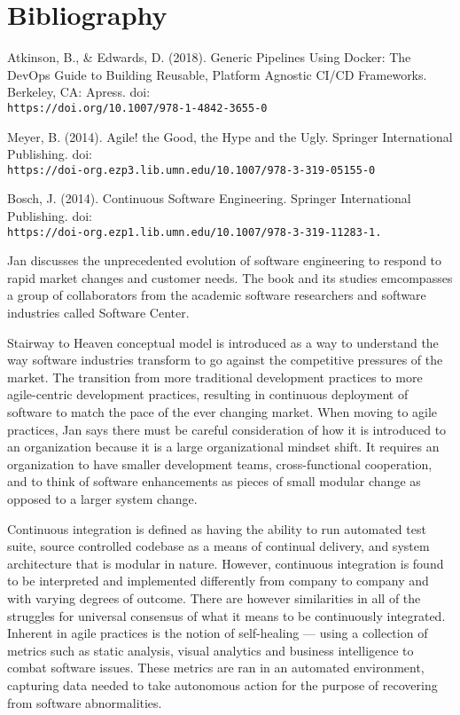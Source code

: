 \documentclass[11pt,a4paper]{article}
\begin{document}
\section{Bibliography}
\begin{thebibliography}{6}
	Atkinson, B., \& Edwards, D. (2018). Generic Pipelines Using Docker: The 		DevOps Guide to Building Reusable, Platform Agnostic CI/CD Frameworks. Berkeley, CA: Apress. doi:\\\texttt{https://doi.org/10.1007/978-1-4842-3655-0}
	
	Meyer, B. (2014). Agile! the Good, the Hype and the Ugly. Springer International Publishing. doi:\\\texttt{https://doi-org.ezp3.lib.umn.edu/10.1007/978-3-319-05155-0}
	
	Bosch, J. (2014). Continuous Software Engineering. Springer International Publishing. doi:\\\texttt{https://doi-org.ezp1.lib.umn.edu/10.1007/978-3-319-11283-1.}
	\begin{adjustwidth}{1cm}{}
		Jan discusses the unprecedented evolution of software engineering to respond to rapid
		market changes and customer needs. The book and its studies emcompasses a group of
		collaborators from the academic software researchers and software industries called
		Software Center.
		
		Stairway to Heaven conceptual model is introduced as a way to understand the way
		software industries transform to go against the competitive pressures of the market.
		The transition from more traditional development practices to more agile-centric
		development practices, resulting in continuous deployment of software to match the
		pace of the ever changing market. When moving to agile practices, Jan says there must
		be careful consideration of how it is introduced to an organization because it is a large
		organizational mindset shift. It requires an organization to have smaller development
		teams, cross-functional cooperation, and to think of software enhancements as pieces
		of small modular change as opposed to a larger system change.
		
		Continuous integration is defined as having the ability to run automated test suite,
		source controlled codebase as a means of continual delivery, and system architecture
		that is modular in nature. However, continuous integration is found to be interpreted
		and implemented differently from company to company and with varying degrees of
		outcome. There are however similarities in all of the struggles for universal consensus of
		what it means to be continuously integrated. Inherent in agile practices is the notion of
		self-healing — using a collection of metrics such as static analysis, visual analytics and
		business intelligence to combat software issues. These metrics are ran in an automated
		environment, capturing data needed to take autonomous action for the purpose of
		recovering from software abnormalities.
		

\end{adjustwidth}
\end{thebibliography}
\end{document}
